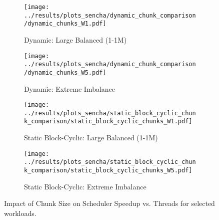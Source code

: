 \documentclass[10pt]{article}
\begin{document}
\begin{figure}[H]
    \centering
    \begin{subfigure}[b]{0.49\textwidth}
        \centering
        \texttt{[image: ../results/plots\_sencha/dynamic\_chunk\_comparison/dynamic\_chunks\_W1.pdf]}
        \caption{Dynamic: Large Balanced (1-1M)}
        \label{fig:chunk_impact_dynamic_balanced}
    \end{subfigure}
    \hfill
    \begin{subfigure}[b]{0.49\textwidth}
        \centering
        \texttt{[image: ../results/plots\_sencha/dynamic\_chunk\_comparison/dynamic\_chunks\_W5.pdf]}
        \caption{Dynamic: Extreme Imbalance}
        \label{fig:chunk_impact_dynamic_imbalance}
    \end{subfigure}

    \vspace{0.5em} %

    \begin{subfigure}[b]{0.49\textwidth}
        \centering
        \texttt{[image: ../results/plots\_sencha/static\_block\_cyclic\_chunk\_comparison/static\_block\_cyclic\_chunks\_W1.pdf]}
        \caption{Static Block-Cyclic: Large Balanced (1-1M)}
        \label{fig:chunk_impact_sbc_balanced}
    \end{subfigure}
    \hfill
    \begin{subfigure}[b]{0.49\textwidth}
        \centering
        \texttt{[image: ../results/plots\_sencha/static\_block\_cyclic\_chunk\_comparison/static\_block\_cyclic\_chunks\_W5.pdf]}
        \caption{Static Block-Cyclic: Extreme Imbalance}
        \label{fig:chunk_impact_sbc_imbalance}
    \end{subfigure}

    \caption{Impact of Chunk Size on Scheduler Speedup vs. Threads for selected workloads.}
    \label{fig:chunk_impact}
\end{figure}
\end{document}
